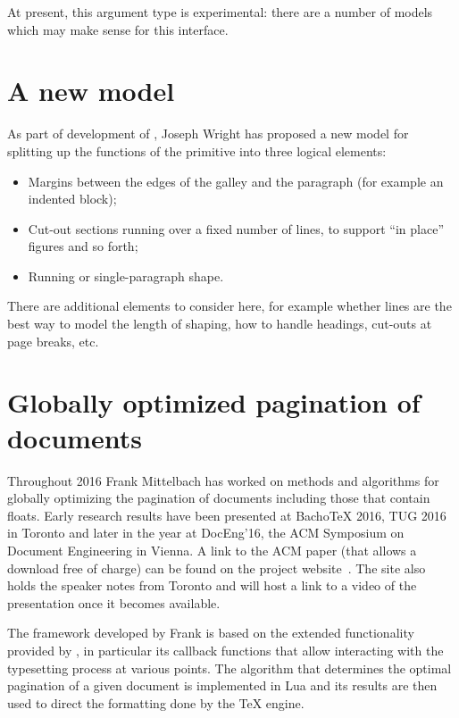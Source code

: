 \documentclass{ltnews}
\begin{document}
At present, this argument type is experimental: there are a number of models
which may make sense for this interface.

\section{A new  model}

As part of development of , Joseph Wright has proposed a new
model for splitting up the functions of the  primitive into three
logical elements:
\begin{itemize}
  \item Margins between the edges of the galley and the paragraph (for example
    an indented block);
  \item Cut-out sections running over a fixed number of lines, to support
    \enquote{in place} figures and so forth;
  \item Running or single-paragraph shape.
\end{itemize}

There are additional elements to consider here, for example whether lines are
the best way to model the length of shaping, how to handle headings, cut-outs
at page breaks, etc.


\section{Globally optimized pagination of documents}

Throughout 2016 Frank Mittelbach has worked on methods and algorithms for
globally optimizing the pagination of documents including those that contain
floats. Early research results have been presented at Bacho\TeX{} 2016, TUG
2016 in Toronto and later in the year at \mbox{DocEng'16}, the ACM Symposium on
Document Engineering in Vienna. A link to the ACM paper (that allows a download
free of charge) can be found on the project
website~\cite{10:project-publications}. The site also holds the speaker notes from
Toronto and will host a link to a video of the presentation once it becomes
available.

The framework developed by Frank is based on the extended functionality
provided by , in particular its callback functions that allow
interacting with the typesetting process at various points. The algorithm that
determines the optimal pagination of a given document is implemented in {Lua}
and its results are then used to direct the formatting done by the \TeX{}
engine.
\end{document}
